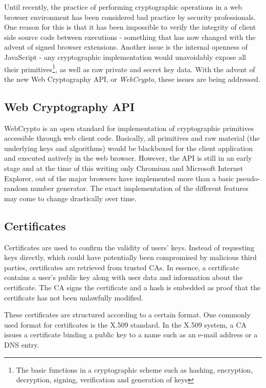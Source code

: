Until recently, the practice of performing cryptographic operations in a web browser environment has been considered bad practice by security professionals\cite{Matasano:Online}. One reason for this is that it has been impossible to verify the integrity of client side source code between executions - something that has now changed with the advent of signed browser extensions. Another issue is the internal openness of JavaScript - any cryptographic implementation would unavoidably expose all their primitives\footnote{The basic functions in a cryptographic scheme such as hashing, encryption, decryption, signing, verification and generation of keys}, as well as raw private and secret key data. With the advent of the new Web Cryptography API, or \emph{WebCrypto}, these issues are being addressed\cite{WebCrypto:Online}.

\subsection{Web Cryptography API}
WebCrypto is an open standard for implementation of cryptographic primitives accessible through web client code\cite{WebCrypto:Online}. Basically, all primitives and raw material (the underlying keys and algorithms) would be blackboxed for the client application and executed natively in the web browser. However, the API is still in an early stage and at the time of this writing only Chromium\cite{ImplementedChromium:Online} and Microsoft Internet Explorer\cite{WCAImplementationMicrosoft:Online}, out of the major browsers have implemented more than a basic pseudo-random number generator\cite{WCAImplementationMozilla:Online}. The exact implementation of the different features may come to change drastically over time.

\subsection{Certificates}
Certificates are used to confirm the validity of users' keys\cite{EETimesCrypto:Online}. Instead of requesting keys directly, which could have potentially been compromised by malicious third parties, certificates are retrieved from trusted CAs. In essence, a certificate contains a user's public key along with user data and information about the certificate. The CA signs the certificate and a hash is embedded as proof that the certificate has not been unlawfully modified.

These certificates are structured according to a certain format. One commonly used format for certificates is the X.509 standard\cite{IETFX509:Online}. In the X.509 system, a CA issues a certificate binding a public key to a name such as an e-mail address or a DNS entry.

